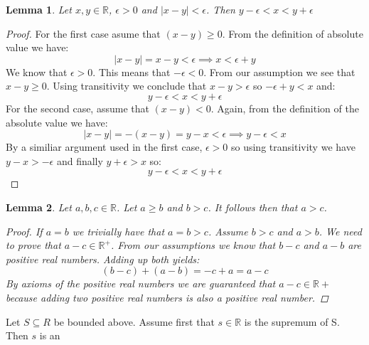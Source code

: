 \documentclass{article}
\newtheorem{lemma}{Lemma}
\begin{document}
\begin{lemma}
    Let \(x, y \in \mathbb{R}\), \(\epsilon > 0\) and \(|x - y| < \epsilon\). Then \(y - \epsilon < x < y + \epsilon\)
\end{lemma}
\begin{proof}
    For the first case asume that \((x - y) \geq 0\). From the definition of absolute value we have:
    \begin{equation*}
        |x - y| = x - y < \epsilon \implies x < \epsilon + y
    \end{equation*}
    We know that \(\epsilon > 0\). This means that \(- \epsilon < 0\). From our assumption we see that \(x - y \geq 0\).
    Using transitivity we conclude that \(x - y > \epsilon\) so \(- \epsilon + y < x\) and:
    \begin{equation*}
        y - \epsilon < x < y + \epsilon
    \end{equation*}
    For the second case, assume that \((x - y) < 0\). Again, from the definition of the absolute value we have:
    \begin{equation*}
        |x - y| = -(x - y) = y - x < \epsilon \implies y - \epsilon < x
    \end{equation*}
    By a similiar argument used in the first case, \(\epsilon > 0\) so using transitivity we have \(y - x > - \epsilon\)
    and finally \(y + \epsilon > x\) so:
    \begin{equation*}
        y - \epsilon < x < y + \epsilon
    \end{equation*}
\end{proof}
\begin{lemma}
    Let \(a, b, c \in \mathbb{R}\). Let \(a \geq b\) and \(b > c\). It follows then that \(a > c\).
    \begin{proof}
        If \(a = b\) we trivially have that \(a = b > c\). Assume \(b > c\) and \(a > b\). We need to prove that \(a - c \in \mathbb{R^+}\).
        From our assumptions we know that \(b - c\) and \(a - b\) are positive real numbers. Adding up both yields:
        \begin{equation*}
            (b - c) + (a - b) = -c + a = a - c
        \end{equation*}
        By axioms of the positive real numbers we are guaranteed that \(a - c \in \mathbb{R+}\) because adding two positive
        real numbers is also a positive real number. 
    \end{proof}
\end{lemma}
Let \(S \subseteq R\) be bounded above. Assume first that \(s \in \mathbb{R}\) is the supremum of S. Then \(s\) is an
\end{document}
